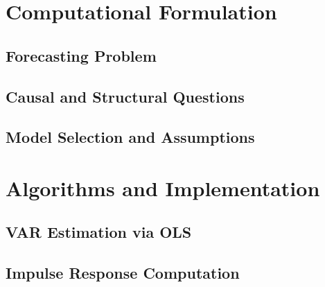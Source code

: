 \documentclass[11pt]{article}
\begin{document}
\section{Computational Formulation}

\subsection{Forecasting Problem}

\subsection{Causal and Structural Questions}

\subsection{Model Selection and Assumptions}

\section{Algorithms and Implementation}


\subsection{VAR Estimation via OLS}

\subsection{Impulse Response Computation}
\end{document}
